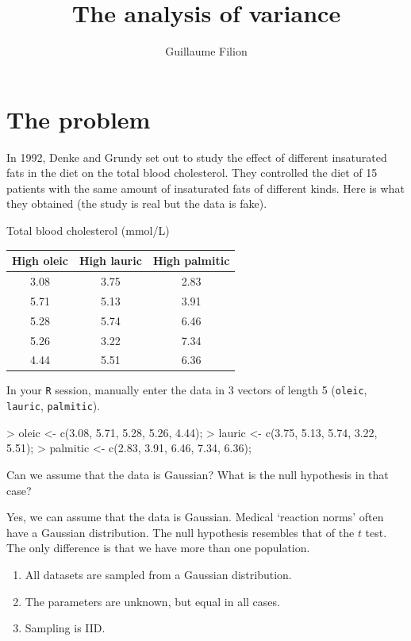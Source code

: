 \documentclass[a4paper]{article}
\title{The analysis of variance}
\author{Guillaume Filion}
\theoremstyle{definition}
\begin{document}
\maketitle


\section{The problem}

In 1992, Denke and Grundy set out to study the effect of different
insaturated fats in the diet on the total blood cholesterol. They
controlled the diet of 15 patients with the same amount of insaturated
fats of different kinds. Here is what they obtained (the study is real
but the data is fake).

\begin{center}
  Total blood cholesterol (mmol/L)
  \par
  \begin{tabular}{ccc}
      High oleic & High lauric & High palmitic \\\hline
      3.08 & 3.75 & 2.83 \\ 
      5.71 & 5.13 & 3.91 \\
      5.28 & 5.74 & 6.46 \\
      5.26 & 3.22 & 7.34 \\
      4.44 & 5.51 & 6.36 \\
  \end{tabular}
\end{center}

In your \texttt{R} session, manually enter the data in 3 vectors of
length 5 (\texttt{oleic}, \texttt{lauric}, \texttt{palmitic}).

\begin{Schunk}
\begin{Sinput}
> oleic <- c(3.08, 5.71, 5.28, 5.26, 4.44);
> lauric <- c(3.75, 5.13, 5.74, 3.22, 5.51);
> palmitic <- c(2.83, 3.91, 6.46, 7.34, 6.36);
\end{Sinput}
\end{Schunk}

\begin{Exercise}
Can we assume that the data is Gaussian? What is the null hypothesis
in that case?
\end{Exercise}
\begin{Answer}
Yes, we can assume that the data is Gaussian. Medical `reaction norms'
often have a Gaussian distribution.
The null hypothesis resembles that of the $t$ test. The only difference
is that we have more than one population.
\begin{enumerate}
\item
All datasets are sampled from a Gaussian distribution.
\item
\label{reject}
The parameters are unknown, but equal in all cases.
\item
Sampling is IID.
\end{enumerate}
\end{Answer}
\end{document}
